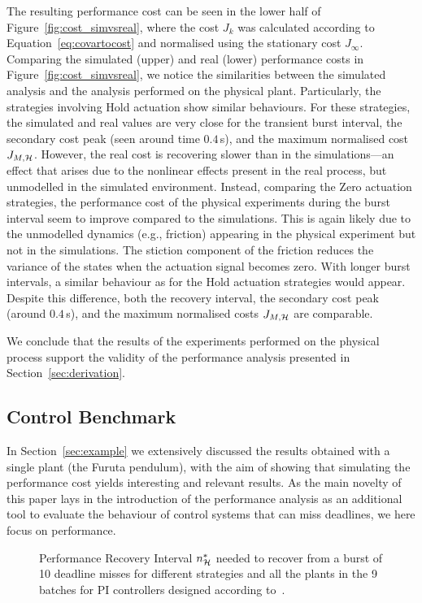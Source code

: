 The resulting performance cost can be seen in the lower half of Figure~\ref{fig:cost_simvsreal}, where the cost $J_k$ was calculated according to Equation~\eqref{eq:covartocost} and normalised using the stationary cost $J_\infty$. 
Comparing the simulated (upper) and real (lower) performance costs in Figure~\ref{fig:cost_simvsreal}, we notice the similarities between the simulated analysis and the analysis performed on the physical plant. 
%
Particularly, the strategies involving Hold actuation show similar behaviours. 
For these strategies, the simulated and real values are very close for the transient burst interval, the secondary cost peak (seen around time $0.4\,$s), and the maximum normalised cost $J_{M, \mathcal{H}}$.
However, the real cost is recovering slower than in the simulations---an effect that arises due to the nonlinear effects present in the real process, but unmodelled in the simulated environment.
%
Instead, comparing the Zero actuation strategies, the performance cost of the physical experiments during the burst interval seem to improve compared to the simulations.
This is again likely due to the unmodelled dynamics (e.g., friction) appearing in the physical experiment but not in the simulations.
The stiction component of the friction reduces the variance of the states when the actuation signal becomes zero.
With longer burst intervals, a similar behaviour as for the Hold actuation strategies would appear.
Despite this difference, both the recovery interval, the secondary cost peak (around $0.4\,$s), and the maximum normalised costs $J_{M,\mathcal{H}}$ are comparable.

We conclude that the results of the experiments performed on the physical process support the validity of the performance analysis presented in Section~\ref{sec:derivation}.

\subsection{Control Benchmark}
\label{sec:aggregateresults}

In Section~\ref{sec:example} we extensively discussed the results obtained with a single plant (the Furuta pendulum), with the aim of showing that simulating the performance cost yields interesting and relevant results.
As the main novelty of this paper lays in the introduction of the performance analysis as an additional tool to evaluate the behaviour of control systems that can miss deadlines, we here focus on performance.

\begin{figure}[t]
    \centering
    \resizebox{0.95\textwidth}{!}{}
    \caption{Performance Recovery Interval $n^*_{\mathcal{H}}$ needed to recover from a burst of 10 deadline misses for different strategies and all the plants in the 9 batches for PI controllers designed according to~\cite{Garpinger:2015}.}
    \label{fig:overview10}
\end{figure}
\afterpage{\clearpage}

